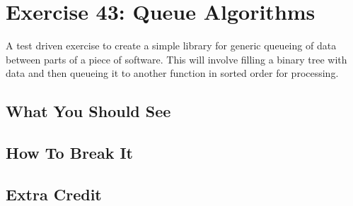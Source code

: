 \chapter{Exercise 43: Queue Algorithms}

A test driven exercise to create a simple library for generic queueing of data between
parts of a piece of software.  This will involve filling a binary tree with data
and then queueing it to another function in sorted order for processing.


\section{What You Should See}


\section{How To Break It}


\section{Extra Credit}



